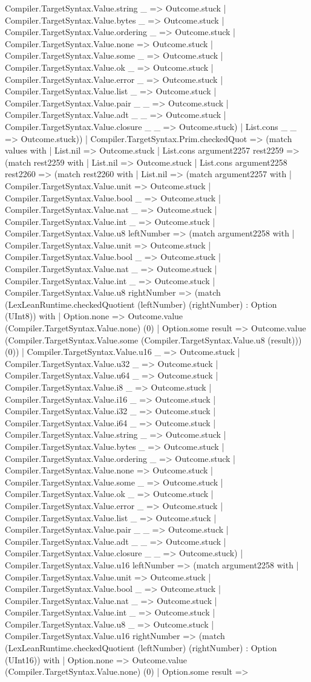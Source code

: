 \documentclass[11pt]{article}
\begin{document}
Compiler.TargetSyntax.Value.string \_ => Outcome.stuck | Compiler.TargetSyntax.Value.bytes \_ => Outcome.stuck | Compiler.TargetSyntax.Value.ordering \_ => Outcome.stuck | Compiler.TargetSyntax.Value.none => Outcome.stuck | Compiler.TargetSyntax.Value.some \_ => Outcome.stuck | Compiler.TargetSyntax.Value.ok \_ => Outcome.stuck | Compiler.TargetSyntax.Value.error \_ => Outcome.stuck | Compiler.TargetSyntax.Value.list \_ => Outcome.stuck | Compiler.TargetSyntax.Value.pair \_ \_ => Outcome.stuck | Compiler.TargetSyntax.Value.adt \_ \_ => Outcome.stuck | Compiler.TargetSyntax.Value.closure \_ \_ => Outcome.stuck) | List.cons \_ \_ => Outcome.stuck)) | Compiler.TargetSyntax.Prim.checkedQuot => (match values with | List.nil => Outcome.stuck | List.cons argument2257 rest2259 => (match rest2259 with | List.nil => Outcome.stuck | List.cons argument2258 rest2260 => (match rest2260 with | List.nil => (match argument2257 with | Compiler.TargetSyntax.Value.unit => Outcome.stuck | Compiler.TargetSyntax.Value.bool \_ => Outcome.stuck | Compiler.TargetSyntax.Value.nat \_ => Outcome.stuck | Compiler.TargetSyntax.Value.int \_ => Outcome.stuck | Compiler.TargetSyntax.Value.u8 leftNumber => (match argument2258 with | Compiler.TargetSyntax.Value.unit => Outcome.stuck | Compiler.TargetSyntax.Value.bool \_ => Outcome.stuck | Compiler.TargetSyntax.Value.nat \_ => Outcome.stuck | Compiler.TargetSyntax.Value.int \_ => Outcome.stuck | Compiler.TargetSyntax.Value.u8 rightNumber => (match (LexLeanRuntime.checkedQuotient (leftNumber) (rightNumber) : Option (UInt8)) with | Option.none => Outcome.value (Compiler.TargetSyntax.Value.none) (0) | Option.some result => Outcome.value (Compiler.TargetSyntax.Value.some (Compiler.TargetSyntax.Value.u8 (result))) (0)) | Compiler.TargetSyntax.Value.u16 \_ => Outcome.stuck | Compiler.TargetSyntax.Value.u32 \_ => Outcome.stuck | Compiler.TargetSyntax.Value.u64 \_ => Outcome.stuck | Compiler.TargetSyntax.Value.i8 \_ => Outcome.stuck | Compiler.TargetSyntax.Value.i16 \_ => Outcome.stuck | Compiler.TargetSyntax.Value.i32 \_ => Outcome.stuck | Compiler.TargetSyntax.Value.i64 \_ => Outcome.stuck | Compiler.TargetSyntax.Value.string \_ => Outcome.stuck | Compiler.TargetSyntax.Value.bytes \_ => Outcome.stuck | Compiler.TargetSyntax.Value.ordering \_ => Outcome.stuck | Compiler.TargetSyntax.Value.none => Outcome.stuck | Compiler.TargetSyntax.Value.some \_ => Outcome.stuck | Compiler.TargetSyntax.Value.ok \_ => Outcome.stuck | Compiler.TargetSyntax.Value.error \_ => Outcome.stuck | Compiler.TargetSyntax.Value.list \_ => Outcome.stuck | Compiler.TargetSyntax.Value.pair \_ \_ => Outcome.stuck | Compiler.TargetSyntax.Value.adt \_ \_ => Outcome.stuck | Compiler.TargetSyntax.Value.closure \_ \_ => Outcome.stuck) | Compiler.TargetSyntax.Value.u16 leftNumber => (match argument2258 with | Compiler.TargetSyntax.Value.unit => Outcome.stuck | Compiler.TargetSyntax.Value.bool \_ => Outcome.stuck | Compiler.TargetSyntax.Value.nat \_ => Outcome.stuck | Compiler.TargetSyntax.Value.int \_ => Outcome.stuck | Compiler.TargetSyntax.Value.u8 \_ => Outcome.stuck | Compiler.TargetSyntax.Value.u16 rightNumber => (match (LexLeanRuntime.checkedQuotient (leftNumber) (rightNumber) : Option (UInt16)) with | Option.none => Outcome.value (Compiler.TargetSyntax.Value.none) (0) | Option.some result => 
\end{document}
